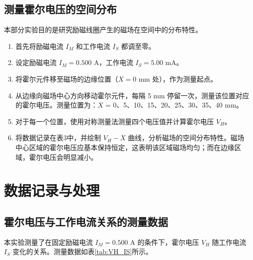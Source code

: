 ﻿\documentclass[12pt,a4paper]{article}
\begin{document}
\subsection{测量霍尔电压的空间分布}

本部分实验目的是研究励磁线圈产生的磁场在空间中的分布特性。

\begin{enumerate}
    \item 首先将励磁电流 $I_M$ 和工作电流 $I_S$ 都调至零。
    
    \item 设定励磁电流 $I_M = 0.500$ A，工作电流 $I_S = 5.00$ mA。
    
    \item 将霍尔元件移至磁场的边缘位置（$X = 0$ mm 处），作为测量起点。
    
    \item 从边缘向磁场中心方向移动霍尔元件，每隔 5 mm 停留一次，测量该位置对应的霍尔电压。测量位置为：$X$ = 0、5、10、15、20、25、30、35、40 mm。
    
    \item 对于每一个位置，使用对称测量法测量四个电压值并计算霍尔电压 $V_H$。
    
    \item 将数据记录在表3中，并绘制 $V_H - X$ 曲线，分析磁场的空间分布特性。磁场中心区域的霍尔电压应基本保持恒定，这表明该区域磁场均匀；而在边缘区域，霍尔电压会明显减小。
\end{enumerate}
\section{数据记录与处理}

\subsection{霍尔电压与工作电流关系的测量数据}

本实验测量了在固定励磁电流 $I_M = 0.500$ A 的条件下，霍尔电压 $V_H$ 随工作电流 $I_S$ 变化的关系。测量数据如表\ref{tab:VH_IS}所示。
\end{document}
